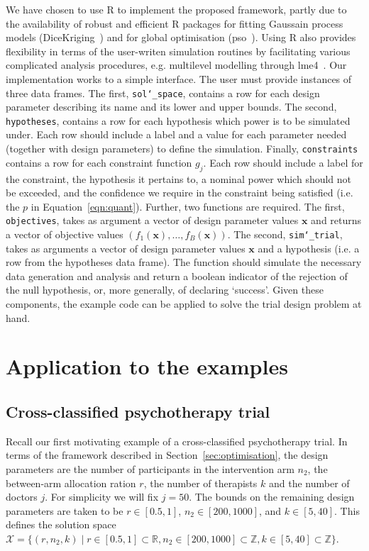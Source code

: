 \documentclass{article} %
\begin{document}
We have chosen to use R to implement the proposed framework, partly due to the availability of robust and efficient R packages for fitting Gaussain process models (DiceKriging~\cite{Roustant2012}) and for global optimisation (pso~\cite{Bendtsen2012}). Using R also provides flexibility in terms of the user-writen simulation routines by facilitating various complicated analysis procedures, e.g. multilevel modelling through lme4~\cite{Bates2015}. Our implementation works to a simple interface. The user must provide instances of three data frames. The first, \texttt{sol\char`_space}, contains a row for each design parameter describing its name and its lower and upper bounds. The second, \texttt{hypotheses}, contains a row for each hypothesis which power is to be simulated under. Each row should include a label and a value for each parameter needed (together with design parameters) to define the simulation. Finally, \texttt{constraints} contains a row for each constraint function $g_{j}$. Each row should include a label for the constraint, the hypothesis it pertains to, a nominal power which should not be exceeded, and the confidence we require in the constraint being satisfied (i.e. the $p$ in Equation~\ref{eqn:quant}). Further, two functions are required. The first, \texttt{objectives}, takes as argument a vector of design parameter values $\mathbf{x}$ and returns a vector of objective values $( f_{1}(\mathbf{x}), \ldots, f_{B}(\mathbf{x}) )$. The second, \texttt{sim\char`_trial}, takes as arguments a vector of design parameter values $\mathbf{x}$ and a hypothesis (i.e. a row from the hypotheses data frame). The function should simulate the necessary data generation and analysis and return a boolean indicator of the rejection of the null hypothesis, or, more generally, of declaring `success'. Given these components, the example code can be applied to solve the trial design problem at hand.

\section{Application to the examples}\label{sec:application}

\subsection{Cross-classified psychotherapy trial}

Recall our first motivating example of a cross-classified psychotherapy trial. In terms of the framework described in Section~\ref{sec:optimisation}, the design parameters are the number of participants in the intervention arm $n_{2}$, the between-arm allocation ration $r$, the number of therapists $k$ and the number of doctors $j$. For simplicity we will fix $j = 50$. The bounds on the remaining design parameters are taken to be $r \in [0.5, 1]$, $n_{2} \in [200, 1000]$, and $k \in [5, 40]$. This defines the solution space $\mathcal{X} = \{(r, n_{2}, k) \mid r \in [0.5, 1] \subset \mathbb{R}, n_{2} \in [200, 1000] \subset \mathbb{Z}, k \in [5, 40] \subset \mathbb{Z} \}$.
\end{document}
